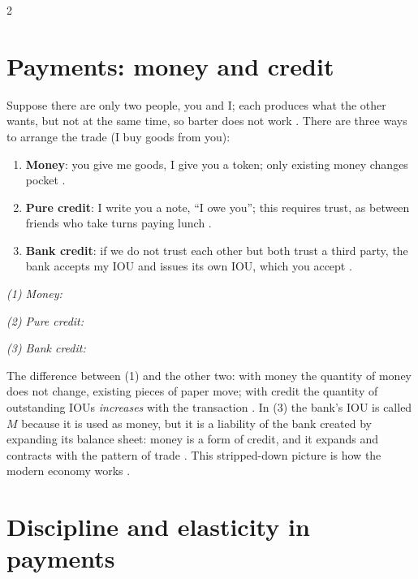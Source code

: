 \begin{paracol}{2}
\section{Payments: money and credit}\label{sec:mv-payments}

Suppose there are only two people, you and I; each produces what the other wants, but not at the same time, so barter does not work
. There are three ways to arrange the trade (I buy goods from you):
\begin{enumerate}
  \item \textbf{Money}: you give me goods, I give you a token; only existing money changes pocket .
  \item \textbf{Pure credit}: I write you a note, ``I owe you''; this requires trust, as between friends who take turns paying lunch
        .
  \item \textbf{Bank credit}: if we do not trust each other but both trust a third party, the bank accepts my IOU and issues its own IOU,
        which you accept .
\end{enumerate}
\begin{taccts}
\textit{(1) Money:}\quad
{}\quad
{}

\medskip
\textit{(2) Pure credit:}\quad
{}\quad
{}

\medskip
\textit{(3) Bank credit:}\quad
{}\quad
{}\quad
{}
\end{taccts}
The difference between (1) and the other two: with money the quantity of money does not change, existing pieces of paper move; with
credit the quantity of outstanding IOUs \emph{increases} with the transaction . In (3) the bank's IOU is
called $M$ because it is used as money, but it is a liability of the bank created by expanding its balance sheet: money is a form of
credit, and it expands and contracts with the pattern of trade . This stripped-down picture is how the
modern economy works .

\section{Discipline and elasticity in payments}\label{sec:mv-de}


\end{paracol}
